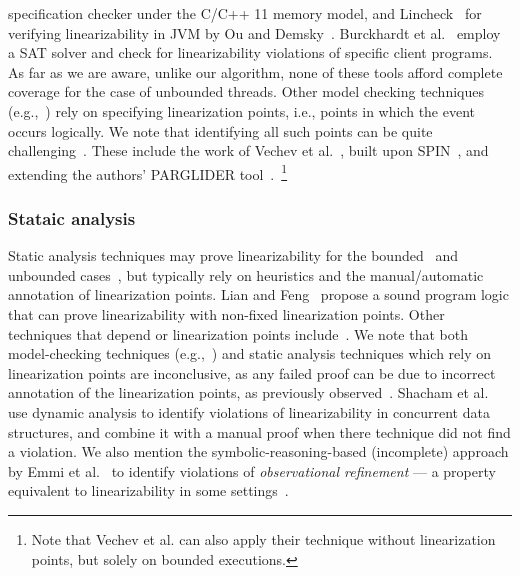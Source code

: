 specification checker under the C/C++ 11 memory model, and 
Lincheck~\cite{KoDeSoTsAl23} for verifying linearizability in JVM by Ou and 
Demsky~\cite{OuDe17}. 
%
Burckhardt et al.~\cite{BuAlMa07} employ a SAT solver and check for 
linearizability violations of specific client programs.
%
As far as we are aware, unlike our algorithm, none of these tools afford 
complete coverage for the case of unbounded threads.
%
Other model checking techniques (e.g.,~\cite{Fl04}) rely on specifying 
linearization points, i.e., points in which the event occurs logically. We note 
that identifying all such points can be quite challenging~\cite{VeYaYo09}.
%
These include the work of Vechev et al.~\cite{VeYaYo09}, built upon 
SPIN~\cite{Ho97}, and extending the authors' PARGLIDER 
tool~\cite{VeYa08}.~\footnote{Note that Vechev et al. can also apply their 
technique without linearization points, but solely on bounded executions.}



\subsubsection{Stataic analysis}

Static analysis techniques may prove linearizability for the 
bounded~\cite{AmRiReSaYa07, BeLeMaRaSa08, MaLeSaRaBe08} and unbounded 
cases~\cite{BeLeMaRaSa08, Va09, 
	Va10}, but typically rely on heuristics and the manual/automatic annotation 
	of 
linearization points. 
%
Lian and Feng~\cite{LiFe13} propose a sound program logic that can prove 
linearizability with non-fixed linearization points.
%
Other techniques that depend or linearization points 
include~\cite{OhRiVeYaYo10, ZhPeHa15, AbJoTr16}. 
%
%
We note that both model-checking techniques (e.g.,~\cite{CeRaZuChAl10}) and 
static analysis techniques which rely on linearization points are inconclusive, 
as any failed proof can be due to incorrect annotation of the linearization 
points, as previously observed~\cite{BoEmCoHa15}.
%
Shacham et al.~\cite{ShBrAiSaVeYa11} use dynamic analysis to identify 
violations of linearizability in concurrent data structures, and combine it 
with a manual proof when there technique did not find a violation.
%
We also mention the symbolic-reasoning-based (incomplete) approach by Emmi et 
al.~\cite{EmEnHa15} to identify violations of \textit{observational refinement} 
--- a property equivalent to linearizability in some settings~\cite{FiOhRiYa10, 
BoEmCoHa15}.
%

